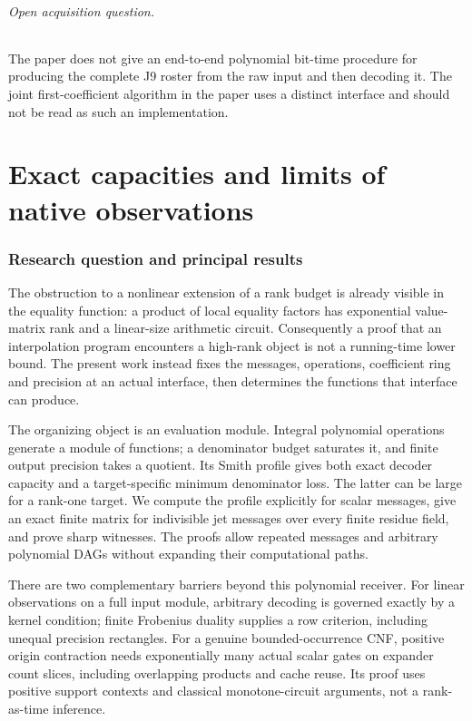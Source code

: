 \documentclass[11pt,a4paper]{article}
\begin{document}
\paragraph*{Open acquisition question.}
The paper does not give an end-to-end polynomial bit-time procedure for
producing the complete J9 roster from the raw input and then decoding it.
The joint first-coefficient algorithm in the paper uses a distinct
interface and should not be read as such an implementation.

\tableofcontents
\part{Exact capacities and limits of native observations}
\section{Research question and principal
results}\label{v8-research-question-and-principal-results}

The obstruction to a nonlinear extension of a rank budget is already
visible in the equality function: a product of local equality factors
has exponential value-matrix rank and a linear-size arithmetic circuit.
Consequently a proof that an interpolation program encounters a
high-rank object is not a running-time lower bound. The present work
instead fixes the messages, operations, coefficient ring and precision
at an actual interface, then determines the functions that interface can
produce.

The organizing object is an evaluation module. Integral polynomial
operations generate a module of functions; a denominator budget
saturates it, and finite output precision takes a quotient. Its Smith
profile gives both exact decoder capacity and a target-specific minimum
denominator loss. The latter can be large for a rank-one target. We
compute the profile explicitly for scalar messages, give an exact finite
matrix for indivisible jet messages over every finite residue field, and
prove sharp witnesses. The proofs allow repeated messages and arbitrary
polynomial DAGs without expanding their computational paths.

There are two complementary barriers beyond this polynomial receiver.
For linear observations on a full input module, arbitrary decoding is
governed exactly by a kernel condition; finite Frobenius duality
supplies a row criterion, including unequal precision rectangles. For a
genuine bounded-occurrence CNF, positive origin contraction needs
exponentially many actual scalar gates on expander count slices,
including overlapping products and cache reuse. Its proof uses positive
support contexts and classical monotone-circuit arguments, not a
rank-as-time inference.
\end{document}
